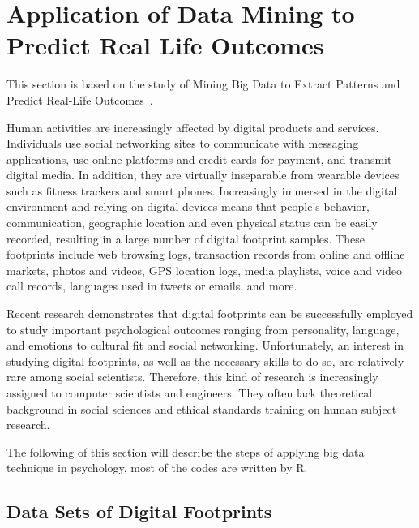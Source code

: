 \section{Application of Data Mining to Predict Real Life Outcomes}

This section is based on the study of Mining Big Data to Extract 
Patterns and Predict Real-Life Outcomes~\cite{editor12}.

Human activities are increasingly affected by digital products and
 services. Individuals use social networking sites to communicate 
with messaging applications, use online platforms and credit cards
 for payment, and transmit digital media. In addition, they are 
virtually inseparable from wearable devices such as fitness 
trackers and smart phones. Increasingly immersed in the digital 
environment and relying on digital devices means that people's 
behavior, communication, geographic location and even physical 
status can be easily recorded, resulting in a large number of 
digital footprint samples. These footprints include web browsing 
logs, transaction records from online and offline markets, photos 
and videos, GPS location logs, media playlists, voice and video 
call records, languages used in tweets or emails, and more.

Recent research demonstrates that digital footprints can be 
successfully employed to study important psychological outcomes 
ranging from personality, language, and emotions to cultural fit
 and social networking. Unfortunately, an interest in studying 
digital footprints, as well as the necessary skills to do so, are 
relatively rare among social scientists. Therefore, this kind of 
research is increasingly assigned to computer scientists and 
engineers. They often lack theoretical background in social 
sciences and ethical standards training on human subject research.

The following of this section will describe the steps of applying 
big data technique in psychology, most of the codes are written by R.

\subsection{Data Sets of Digital Footprints}

